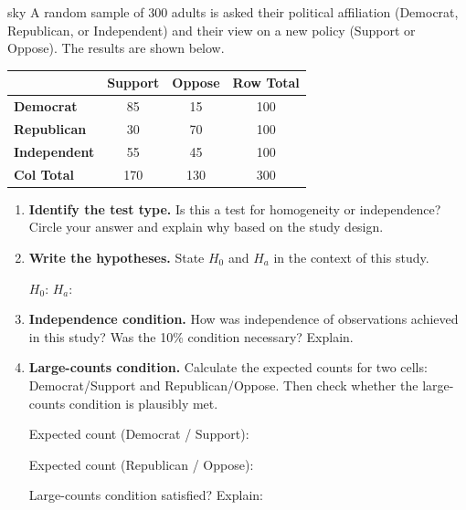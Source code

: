 \documentclass[10pt]{article}
\begin{document}
\vspace{0.1in}

\begin{scenariobox}{sky}
A random sample of 300 adults is asked their political affiliation (Democrat, Republican,
or Independent) and their view on a new policy (Support or Oppose).
The results are shown below.

\vspace{0.08in}
\renewcommand{\arraystretch}{1.4}
\begin{tabularx}{0.72\linewidth}{l ccc}
    & \textbf{Support} & \textbf{Oppose} & \textbf{Row Total} \\
    \hline
    \textbf{Democrat}    & 85 & 15  & 100 \\
    \textbf{Republican}  & 30 & 70  & 100 \\
    \textbf{Independent} & 55 & 45  & 100 \\
    \hline
    \textbf{Col Total}   & 170 & 130 & 300 \\
\end{tabularx}
\end{scenariobox}

\begin{enumerate}[label=\textbf{B\arabic*.}]

    \item \textbf{Identify the test type.} Is this a test for homogeneity or independence?
          Circle your answer and explain why based on the study design.

    \item \textbf{Write the hypotheses.} State $H_0$ and $H_a$ in the context of this study.

          $H_0$: \writeline
          $H_a$: \writeline

    \item \textbf{Independence condition.} How was independence of observations achieved
          in this study? Was the 10\% condition necessary? Explain.

    \item \textbf{Large-counts condition.} Calculate the expected counts for two cells:
          Democrat/Support and Republican/Oppose. Then check whether the large-counts
          condition is plausibly met.

          Expected count (Democrat / Support): \blank{5cm}

          Expected count (Republican / Oppose): \blank{5cm}

          Large-counts condition satisfied? \blank{2cm} \quad Explain: \writeline

\end{enumerate}
\end{document}
